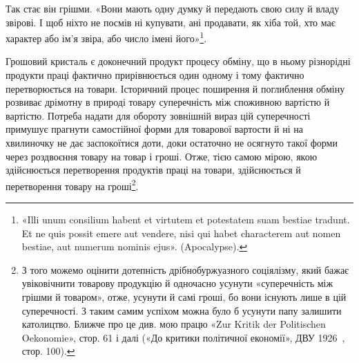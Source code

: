 \parcont{}  %
Так стає він грішми. «Вони мають одну думку й передають свою
силу й владу звірові. І щоб ніхто не посмів ні купувати, ані
продавати, як хіба той, хто має характер або ім’я звіра, або число
імені його»\footnote*{
«Illi unum consilium habent et virtutem et potestatem suam bestiae
tradunt. Et ne quis possit emere aut vendere, nisi qui habet characterem
aut nomen bestiae, aut numerum nominis ejus». (Apocalypse).
}.

Грошовий кристаль є доконечний продукт процесу обміну,
що в ньому різнорідні продукти праці фактично прирівнюється
один одному і тому фактично перетворюється на товари. Історичний
процес поширення й поглиблення обміну розвиває дрімотну
в природі товару суперечність між споживною вартістю й вартістю.
Потреба надати для обороту зовнішній вираз цій суперечності
примушує прагнути самостійної форми для товарової вартости
й ні на хвилиночку не дає заспокоїтися доти, доки остаточно
не осягнуто такої форми через роздвоєння товару на товар і
гроші. Отже, тією самою мірою, якою здійснюється перетворення
продуктів праці на товари, здійснюється й перетворення товару
на гроші\footnote{
З того можемо оцінити дотепність дрібнобуржуазного соціялізму,
який бажає увіковічнити товарову продукцію й одночасно усунути «суперечність
між грішми й товаром», отже, усунути й самі гроші, бо вони
існують лише в цій суперечності. З таким самим успіхом можна було б
усунути папу залишити католицтво. Ближче про це див. мою працю «Zur
Kritik der Politischen Oekonomie», стор. 61 і далі («До критики політичної
економії», ДВУ 1926~, стор. 100).
}.

